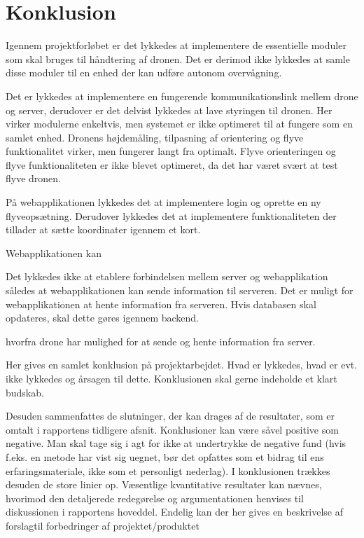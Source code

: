 \section{Konklusion}



Igennem projektforløbet er det lykkedes at implementere de essentielle moduler som skal bruges til håndtering af dronen. Det er derimod ikke lykkedes at samle disse moduler til en enhed der kan udføre autonom overvågning. 

Det er lykkedes at implementere en fungerende kommunikationslink mellem drone og server, derudover er det delvist lykkedes at lave styringen til dronen. Her virker modulerne enkeltvis, men systemet er ikke optimeret til at fungere som en samlet enhed. Dronens højdemåling, tilpasning af orientering og flyve funktionalitet virker, men fungerer langt fra optimalt. Flyve orienteringen og flyve funktionaliteten er ikke blevet optimeret, da det har været svært at test flyve dronen. 


På webapplikationen lykkedes det at implementere login og oprette en ny flyveopsætning. Derudover lykkedes det at implementere funktionaliteten der tillader at sætte koordinater igennem et kort.



Webapplikationen kan

Det lykkedes ikke at etablere forbindelsen mellem server og webapplikation således at webapplikationen kan sende information til serveren. Det er muligt for webapplikationen at hente information fra serveren. Hvis databasen skal opdateres, skal dette gøres igennem backend. 

hvorfra drone har mulighed for at sende og hente information fra server.


Her gives en samlet konklusion på projektarbejdet. Hvad er lykkedes, hvad er evt. ikke 
lykkedes og årsagen til dette. Konklusionen skal gerne indeholde et klart budskab. 

Desuden sammenfattes de slutninger, der kan drages af de resultater, som er omtalt i rapportens tidligere afsnit. Konklusioner kan være såvel positive som negative. Man skal 
tage sig i agt for ikke at undertrykke de negative fund (hvis f.eks. en metode har vist sig 
uegnet, bør det opfattes som et bidrag til ens erfaringsmateriale, ikke som et personligt 
nederlag). 
I konklusionen trækkes desuden de store linier op. Væsentlige kvantitative resultater kan 
nævnes, hvorimod den detaljerede redegørelse og argumentationen henvises til diskussionen i rapportens hoveddel. 
Endelig kan der her gives en beskrivelse af forslagtil forbedringer af projektet/produktet